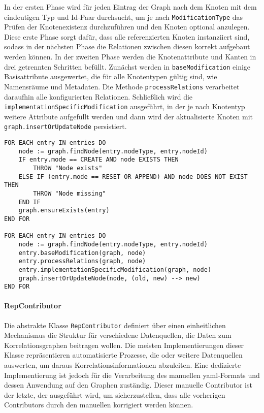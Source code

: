 In der ersten Phase wird für jeden Eintrag der Graph nach dem Knoten mit dem eindeutigen Typ und Id-Paar durchsucht, um je nach \texttt{ModificationType} das Prüfen der Knotenexistenz durchzuführen und den Knoten optional anzulegen.
Diese erste Phase sorgt dafür, dass alle referenzierten Knoten instanziiert sind, sodass in der nächsten Phase die Relationen zwischen diesen korrekt aufgebaut werden können.
In der zweiten Phase werden die Knotenattribute und Kanten in drei getrennten Schritten befüllt.
Zunächst werden in \texttt{baseModification} einige Basisattribute ausgewertet, die für alle Knotentypen gültig sind, wie Namensräume und Metadaten.
Die Methode \texttt{processRelations} verarbeitet daraufhin alle konfigurierten Relationen.
Schließlich wird die \texttt{implementationSpecificModification} ausgeführt, in der je nach Knotentyp weitere Attribute aufgefüllt werden und dann wird der aktualisierte Knoten mit \texttt{graph.insertOrUpdateNode} persistiert.

\begin{lstlisting}[language=pseudo,caption={Ablauf des Modifikationssystems für eine Menge an Modifikationen},label=lst:modifikation-pseudocode,basicstyle=\ttfamily\scriptsize]
FOR EACH entry IN entries DO
    node := graph.findNode(entry.nodeType, entry.nodeId)
    IF entry.mode == CREATE AND node EXISTS THEN
        THROW "Node exists"
    ELSE IF (entry.mode == RESET OR APPEND) AND node DOES NOT EXIST THEN
        THROW "Node missing"
    END IF
    graph.ensureExists(entry)
END FOR

FOR EACH entry IN entries DO
    node := graph.findNode(entry.nodeType, entry.nodeId)
    entry.baseModification(graph, node)
    entry.processRelations(graph, node)
    entry.implementationSpecificModification(graph, node)
    graph.insertOrUpdateNode(node, (old, new) --> new)
END FOR
\end{lstlisting}

\paragraph{RepContributor}

Die abstrakte Klasse \texttt{RepContributor} definiert über einen einheitlichen Mechanismus die Struktur für verschiedene Datenquellen, die Daten zum Korrelationsgraphen beitragen wollen.
Die meisten Implementierungen dieser Klasse repräsentieren automatisierte Prozesse, die  oder weitere Datenquellen auswerten, um daraus Korrelationsinformationen abzuleiten.
Eine dedizierte Implementierung ist jedoch für die Verarbeitung des manuellen \acrshort{yaml}-Formats und dessen Anwendung auf den Graphen zuständig.
Dieser manuelle Contributor ist der letzte, der ausgeführt wird, um sicherzustellen, dass alle vorherigen Contributors durch den manuellen korrigiert werden können.

